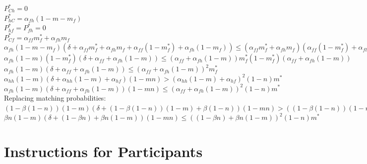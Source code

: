 {{$P _ { C h  } ^ { * }= 0$\\

$P _{h C} ^ { * } = \alpha _ { f h } \left( 1 - m - m _ { f } \right)$ \\

$ P_{ hf }  ^ { * } = P _ { f h } ^ { * } = 0$\\

$P _ { C f } ^ { * } = \alpha _ { f f } m _ { f } ^ { * } + \alpha _ { f h } m _ { f }$\\

$\alpha_{fh}(1-m- m_f)( \delta + \alpha_{ff} m_f^*+\alpha_{fh}m_f+\alpha_{ff}(1- m_f^*)+\alpha _ { fh }(1-m_f)) \leq (\alpha_{ff}m_f^*+\alpha_{fh}m_f)(\alpha_{ff}(1-m_f^*)+\alpha_{fh}(1-m-m_f))$\\

$ \alpha _ { fh }  ( 1 - m )  ( 1 - m^*_f )( \delta + \alpha_{ff}+ \alpha_{fh}(1-m)) \leq (\alpha _ { ff }+ \alpha _ { fh } ( 1 - m )) m _ { f }^* ( 1 - m_f ^*)(\alpha_{ff}+\alpha_{fh}(1-m))$\\

$ \alpha _ { fh }  ( 1 - m )  ( \delta + \alpha_{ff}+ \alpha_{fh}(1-m)) \leq (\alpha _ { ff }+ \alpha _ { fh } ( 1 - m ))^2  m_f^*$\\

$\alpha_{hh} ( 1 - m ) ( \delta + \alpha_{hh} (1-m)+ \alpha_{hf} ) ( 1 - m n ) > ( \alpha _{hh} ( 1 - m ) + \alpha_{hf} ) ^ { 2 } ( 1 - n ) m^*$\\

$\alpha _ {fh } ( 1 - m ) ( \delta + \alpha_{ff} + \alpha_{fh}  ( 1 - m ) ) ( 1 - m n ) \leq \left( \alpha _ { ff } + \alpha_{fh}  ( 1 - m ) \right) ^ { 2 } ( 1 - n ) m^*$\\

Replacing matching probabilities:\\

$( 1 - \beta ( 1 - n ) ) ( 1 - m ) ( \delta + ( 1 - \beta ( 1 - n ) ) ( 1 - m ) + \beta ( 1 - n ) ) ( 1 - m n ) > ( ( 1 - \beta ( 1 - n ) ) ( 1 - m ) + \beta ( 1 - n ) ) ^ { 2 } ( 1 - n ) m ^ { *}$\\

$\beta n ( 1 - m ) ( \delta + ( 1 - \beta n ) + \beta n ( 1 - m ) ) ( 1 - m n ) \leq ( ( 1 - \beta n ) + \beta n ( 1 - m ) ) ^ { 2 } ( 1 - n ) m ^ { * }$


\newpage






\section{Instructions for Participants}

}}
